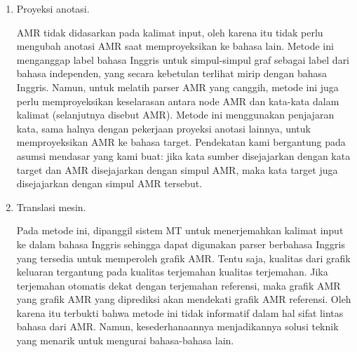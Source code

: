 \begin{enumerate}
  \item Proyeksi anotasi.

  \gls{AMR} tidak didasarkan pada kalimat input, oleh karena itu tidak perlu mengubah anotasi \gls{AMR} saat memproyeksikan ke bahasa lain.
  Metode ini menganggap label bahasa Inggris untuk simpul-simpul graf sebagai label dari bahasa independen, yang secara kebetulan terlihat mirip dengan bahasa Inggris.
  Namun, untuk melatih parser \gls{AMR} yang canggih, metode ini juga perlu memproyeksikan keselarasan antara node \gls{AMR} dan kata-kata dalam kalimat (selanjutnya disebut \gls{AMR}).
  Metode ini menggunakan penjajaran kata, sama halnya dengan pekerjaan proyeksi anotasi lainnya, untuk memproyeksikan \gls{AMR} ke bahasa target.
  Pendekatan kami bergantung pada asumsi mendasar yang kami buat: jika kata sumber disejajarkan dengan kata target dan \gls{AMR} disejajarkan dengan simpul \gls{AMR}, maka kata target juga disejajarkan dengan simpul \gls{AMR} tersebut.

  \item Translasi mesin.

  Pada metode ini, dipanggil sistem MT untuk menerjemahkan kalimat input ke dalam bahasa Inggris sehingga dapat digunakan parser berbahasa Inggris yang tersedia untuk memperoleh grafik \gls{AMR}.
  Tentu saja, kualitas dari grafik keluaran tergantung pada kualitas terjemahan kualitas terjemahan.
  Jika terjemahan otomatis dekat dengan terjemahan referensi, maka grafik \gls{AMR} yang grafik \gls{AMR} yang diprediksi akan mendekati grafik \gls{AMR} referensi.
  Oleh karena itu terbukti bahwa metode ini tidak informatif dalam hal sifat lintas bahasa dari \gls{AMR}.
  Namun, kesederhanaannya menjadikannya solusi teknik yang menarik untuk mengurai bahasa-bahasa lain.
\end{enumerate}
